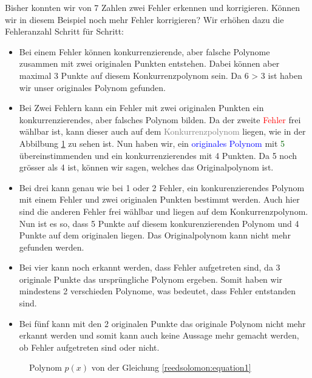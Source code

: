\begin{beispiel}
Bisher konnten wir von 7 Zahlen zwei Fehler erkennen und korrigieren. Können wir in diesem Beispiel noch mehr Fehler korrigieren? 
Wir erhöhen dazu die Fehleranzahl Schritt für Schritt:
\begin{itemize}
    \item[\textit{1 Fehler}:] Bei einem Fehler können konkurrenzierende, aber falsche Polynome zusammen mit zwei originalen Punkten entstehen.
        Dabei können aber maximal 3 Punkte auf diesem Konkurrenzpolynom sein.
        Da 6 > 3 ist haben wir unser originales Polynom gefunden.
    \item[\textit{2 Fehler}:] Bei Zwei Fehlern kann ein Fehler mit zwei originalen Punkten ein konkurrenzierendes, aber falsches Polynom bilden.
        Da der zweite \textcolor{red}{Fehler} frei wählbar ist, kann dieser auch auf dem \textcolor{gray}{Konkurrenzpolynom} liegen, wie in der Abbilbung \ref{fig:polynom} zu sehen ist.
        Nun haben wir, ein \textcolor{blue}{originales Polynom} mit \textcolor{darkgreen}{5} übereinstimmenden und ein konkurrenzierendes mit 4 Punkten.
        Da 5 noch grösser als 4 ist, können wir sagen, welches das Originalpolynom ist.
    \item[\textit{3 Fehler}:] Bei drei kann genau wie bei 1 oder 2 Fehler, ein konkurenzierendes Polynom mit einem Fehler und zwei originalen Punkten bestimmt werden.
        Auch hier sind die anderen Fehler frei wählbar und liegen auf dem Konkurrenzpolynom.
        Nun ist es so, dass 5 Punkte auf diesem konkurenzierenden Polynom und 4 Punkte auf dem originalen liegen.
        Das Originalpolynom kann nicht mehr gefunden werden.
    \item[\textit{4 Fehler}:] Bei vier kann noch erkannt werden, dass Fehler aufgetreten sind, da 3 originale Punkte das ursprüngliche Polynom ergeben.
        Somit haben wir mindestens 2 verschieden Polynome, was bedeutet, dass Fehler entstanden sind.
    \item[\textit{5 Fehler:}] Bei fünf kann mit den 2 originalen Punkte das originale Polynom nicht mehr erkannt werden und 
        somit kann auch keine Aussage mehr gemacht werden, ob Fehler aufgetreten sind oder nicht.
\end{itemize}

\begin{figure}%
	\centering
    
	\caption{Polynom $p(x)$ von der Gleichung \eqref{reedsolomon:equation1}}
	\label{fig:polynom}
\end{figure}
\qedhere
\end{beispiel}

